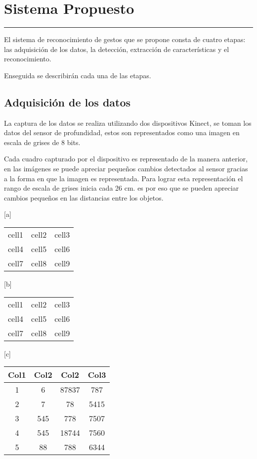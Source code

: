 \chapter{Sistema Propuesto}\label{capit:cap3}
\vspace{-2.0325ex}%
\noindent
\rule{\textwidth}{0.5pt}
\vspace{-5.5ex}%
\newcommand{\pushline}{\Indp}%

El sistema de reconocimiento de gestos que se propone consta de cuatro etapas: las adquisición de los datos, la detección, extracción de características y el reconocimiento. 

Enseguida se describirán cada una de las etapas. 

\section{Adquisición de los datos}

La captura de los datos se realiza utilizando dos dispositivos Kinect, se toman los datos del sensor de profundidad, estos son representados como una imagen en escala de grises de 8 bits.  

Cada cuadro capturado por el dispositivo es representado de la manera anterior, en las imágenes se puede apreciar pequeños cambios detectados al sensor gracias a la forma en que la imagen es representada. Para lograr esta representación el rango de escala de grises inicia cada 26 cm. es por eso que se pueden apreciar cambios pequeños en las distancias entre los objetos. 

\begin{center}[a]
\begin{tabular}{ c c c }
 cell1 & cell2 & cell3 \\ 
 cell4 & cell5 & cell6 \\  
 cell7 & cell8 & cell9    
\end{tabular}
\end{center}

\begin{center}[b]
\begin{tabular}{ |c|c|c| } 
 \hline
 cell1 & cell2 & cell3 \\ 
 cell4 & cell5 & cell6 \\ 
 cell7 & cell8 & cell9 \\ 
 \hline
\end{tabular}
\end{center}

\begin{center}[c]
 \begin{tabular}{||c c c c||} 
 \hline
 Col1 & Col2 & Col2 & Col3 \\ [0.5ex] 
 \hline\hline
 1 & 6 & 87837 & 787 \\ 
 \hline
 2 & 7 & 78 & 5415 \\
 \hline
 3 & 545 & 778 & 7507 \\
 \hline
 4 & 545 & 18744 & 7560 \\
 \hline
 5 & 88 & 788 & 6344 \\ [1ex] 
 \hline
\end{tabular}
\end{center}

